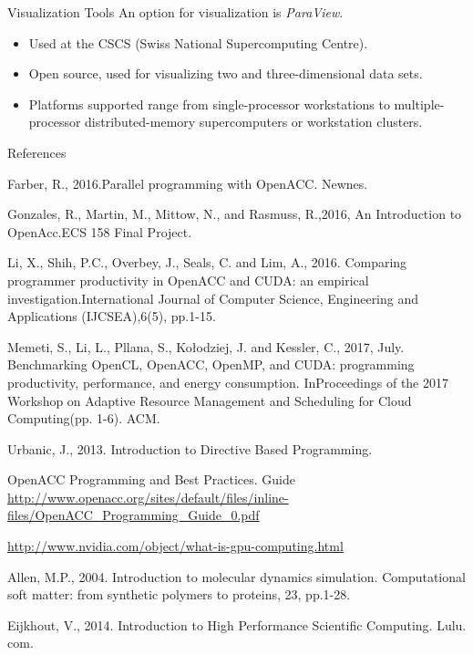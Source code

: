 \documentclass[aspectratio=169]{beamer}
\begin{document}
\begin{frame}[fragile]{Visualization Tools}
	An option for visualization is \emph{ParaView}.
	\begin{itemize}
		\item Used at the CSCS (Swiss National Supercomputing Centre).
		\item Open source, used for visualizing two and three-dimensional data sets.
		\item Platforms supported range from single-processor workstations to multiple-processor distributed-memory supercomputers or workstation clusters.
	\end{itemize}
\end{frame}

\begin{frame}[fragile]{References}

\begin{itemize}
\small{\item Farber, R., 2016.Parallel programming with OpenACC. Newnes.
\item Gonzales, R.,  Martin, M., Mittow, N., and Rasmuss, R.,2016, An Introduction to OpenAcc.ECS 158 Final Project.
\item Li, X., Shih, P.C., Overbey, J., Seals, C. and Lim, A., 2016. Comparing programmer productivity in OpenACC and CUDA: an empirical investigation.International Journal of Computer Science, Engineering and Applications (IJCSEA),6(5), pp.1-15.
\item Memeti, S., Li, L., Pllana, S., Kołodziej, J. and Kessler, C., 2017, July. Benchmarking OpenCL, OpenACC, OpenMP, and CUDA: programming productivity, performance, and energy consumption. InProceedings of the 2017 Workshop on Adaptive Resource Management and Scheduling for Cloud Computing(pp. 1-6). ACM.
\item Urbanic, J., 2013. Introduction to Directive Based Programming.
\item OpenACC Programming and Best Practices. Guide \url{http://www.openacc.org/sites/default/files/inline-files/OpenACC_Programming_Guide_0.pdf}
\item \url{http://www.nvidia.com/object/what-is-gpu-computing.html}}
\item Allen, M.P., 2004. Introduction to molecular dynamics simulation. Computational soft matter: from synthetic polymers to proteins, 23, pp.1-28.
\item Eijkhout, V., 2014. Introduction to High Performance Scientific Computing. Lulu. com.
\end{itemize}

\end{frame}
\end{document}

